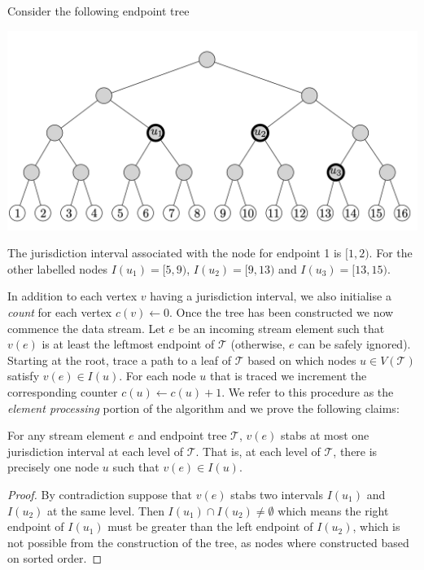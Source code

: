 \begin{example}
    Consider the following endpoint tree
    \begin{center}
        \includegraphics[scale=0.3]{thesis/figures/endpointTree2.png}
    \end{center}
    The jurisdiction interval associated with the node for endpoint 1 is $[1, 2)$. For the other labelled nodes $I(u_1) = [5, 9)$, $I(u_2) = [9, 13)$ and $I(u_3) = [13, 15)$.
\end{example}


In addition to each vertex $v$ having a jurisdiction interval, we also initialise a \textit{count} for each vertex $c(v) \leftarrow 0$. Once the tree has been constructed we now commence the data stream. Let $e$ be an incoming stream element such that $v(e)$ is at least the leftmost endpoint of $\mathcal{T}$ (otherwise, $e$ can be safely ignored). Starting at the root, trace a path to a leaf of $\mathcal{T}$ based on which nodes $u\in V(\mathcal{T})$ satisfy $v(e) \in I(u)$. For each node $u$ that is traced we increment the corresponding counter $c(u) \leftarrow c(u) + 1$. We refer to this procedure as the \textit{element processing} portion of the algorithm and we prove the following claims: 

\begin{lemma} For any stream element $e$ and endpoint tree $\mathcal{T}$, $v(e)$ stabs at most one jurisdiction interval at each level of $\mathcal{T}$. That is, at each level of $\mathcal{T}$, there is precisely one node $u$ such that $v(e)\in I(u)$.
\end{lemma}
\begin{proof}
    By contradiction suppose that $v(e)$ stabs two intervals $I(u_1)$ and $I(u_2)$ at the same level. Then $I(u_1) \cap I(u_2)\neq \emptyset$ which means the right endpoint of $I(u_1)$ must be greater than the left endpoint of $I(u_2)$, which is not possible from the construction of the tree, as nodes where constructed based on sorted order.
\end{proof}

